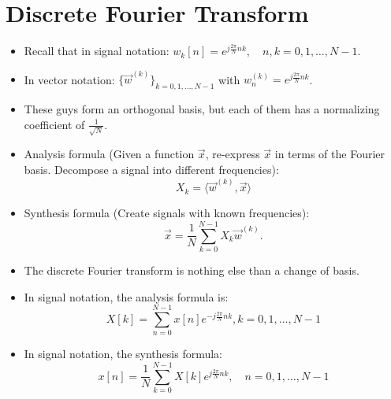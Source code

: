 \documentclass[../main.tex]{subfiles}
\begin{document}
\section{Discrete Fourier Transform}
\begin{itemize}
    \item Recall that in signal notation: $w_k[n]=e^{j\frac{2\pi}{N}nk}, \quad n,k=0,1,\dots, N-1$.
    \item In vector notation: $\{\vec w^{(k)}\}_{k=0,1,\dots, N-1}$ with $w_n^{(k)}=e^{j\frac{2\pi}{N}nk}$.
    \item These guys form an orthogonal basis, but each of them has a normalizing coefficient of $\frac{1}{\sqrt{N}}$.
    \item Analysis formula (Given a function $\vec x$, re-express $\vec x$ in terms of the Fourier basis. Decompose a signal into different frequencies): \[
    X_k = \langle \vec w^{(k)}, \vec x\rangle
    \]
    \item Synthesis formula (Create signals with known frequencies): \[
    \vec x = \frac{1}{N}\sum_{k=0}^{N-1}X_k\vec w^{(k)}.
    \]
    \item The discrete Fourier transform is nothing else than a change of basis.
    \item In signal notation, the analysis formula is: \[
    X[k]=\sum_{n=0}^{N-1}x[n]e^{-j\frac{2\pi}{N}nk}, k=0,1,\dots, N-1
    \]
    \item In signal notation, the synthesis formula: \[
    x[n]=\frac{1}{N}\sum_{k=0}^{N-1}X[k]e^{j\frac{2\pi}{N}nk},\quad n=0,1,\dots, N-1
    \]
\end{itemize}
\end{document}
